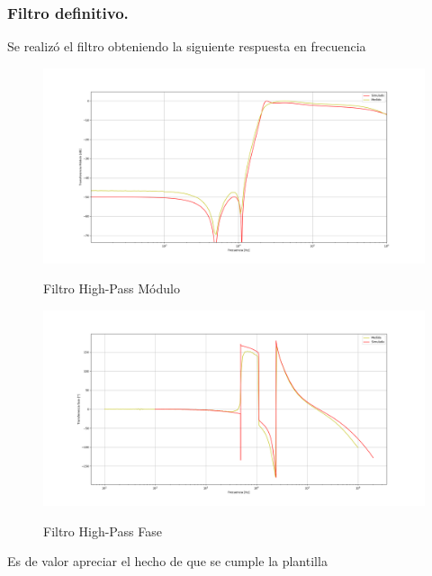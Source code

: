 \subsubsection{Filtro definitivo.}
Se realizó el filtro obteniendo la siguiente respuesta en frecuencia 
\begin{figure}[H]
	\centering
	\includegraphics[width=\textwidth]{Imagenes-Ej3/BodeSedra.png}
	\label{fig:BodeSedra}
	\caption{Filtro High-Pass Módulo}
\end{figure}
\begin{figure}[H]
	\centering
	\includegraphics[width=\textwidth]{Imagenes-Ej3/FaseBodeSedra.png}
	\label{fig:FaseBodeSedra}
	\caption{Filtro High-Pass Fase}
\end{figure}
Es de valor apreciar el hecho de que se cumple la plantilla
